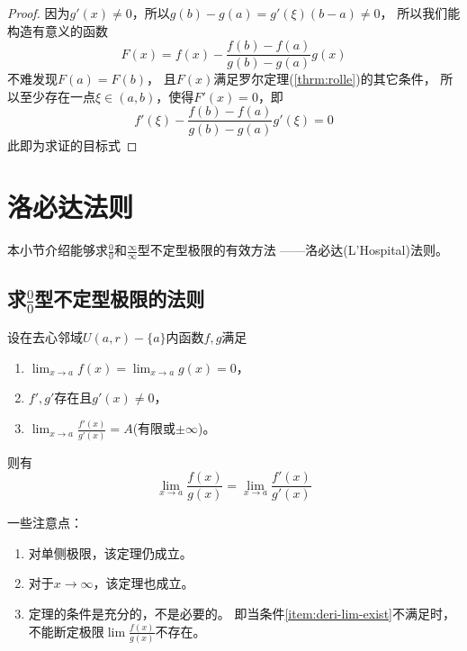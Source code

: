 \begin{proof}
  因为$g'(x)\neq 0$，所以$g(b)-g(a)=g'(\xi)(b-a)\neq 0$，
  所以我们能构造有意义的函数
  \begin{displaymath}
    F(x)=f(x)-\frac{f(b)-f(a)}{g(b)-g(a)}g(x)
  \end{displaymath}
  不难发现$F(a)=F(b)$，
  且$F(x)$满足罗尔定理(\ref{thrm:rolle})的其它条件，
  所以至少存在一点$\xi\in(a,b)$，使得$F'(x)=0$，即
  \begin{displaymath}
    f'(\xi)-\frac{f(b)-f(a)}{g(b)-g(a)}g'(\xi)=0
  \end{displaymath}
  此即为求证的目标式
\end{proof}

\section{洛必达法则}
本小节介绍能够求$\frac{0}{0}$和$\frac{\infty}{\infty}$型不定型极限的有效方法
——洛必达(L'Hospital)法则。

\subsection{求$\frac{0}{0}$型不定型极限的法则}
\begin{theorem}
  设在去心邻域$U(a,r)-\{a\}$内函数$f,g$满足
  \begin{enumerate}
    \item
    $\lim_{x\to a} f(x) = \lim_{x\to a}g(x) = 0$，
    \item
    $f',g'$存在且$g'(x) \neq 0$，
    \item \label{item:deri-lim-exist}
    $\lim_{x\to a} \frac{f'(x)}{g'(x)}=A$(有限或$\pm\infty$)。
  \end{enumerate}
  则有
  \begin{displaymath}
    \lim_{x\to a}\frac{f(x)}{g(x)}=\lim_{x\to a} \frac{f'(x)}{g'(x)}
  \end{displaymath}
\end{theorem}

\begin{remark}
  一些注意点：
  \begin{enumerate}
    \item
    对单侧极限，该定理仍成立。
    \item
    对于$x\to\infty$，该定理也成立。
    \item
    定理的条件是充分的，不是必要的。
    即当条件\ref{item:deri-lim-exist}不满足时，
    不能断定极限$\lim \frac{f(x)}{g(x)}$不存在。
  \end{enumerate}
\end{remark}

